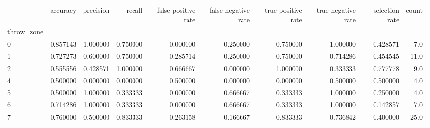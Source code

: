 \begin{tabular}{lrrrrrrrrr}
\toprule
{} &  accuracy &  precision &    recall &  false positive rate &  false negative rate &  true positive rate &  true negative rate &  selection rate &  count \\
throw\_zone &           &            &           &                      &                      &                     &                     &                 &        \\
\midrule
0          &  0.857143 &   1.000000 &  0.750000 &             0.000000 &             0.250000 &            0.750000 &            1.000000 &        0.428571 &    7.0 \\
1          &  0.727273 &   0.600000 &  0.750000 &             0.285714 &             0.250000 &            0.750000 &            0.714286 &        0.454545 &   11.0 \\
2          &  0.555556 &   0.428571 &  1.000000 &             0.666667 &             0.000000 &            1.000000 &            0.333333 &        0.777778 &    9.0 \\
4          &  0.500000 &   0.000000 &  0.000000 &             0.500000 &             0.000000 &            0.000000 &            0.500000 &        0.500000 &    4.0 \\
5          &  0.500000 &   1.000000 &  0.333333 &             0.000000 &             0.666667 &            0.333333 &            1.000000 &        0.250000 &    4.0 \\
6          &  0.714286 &   1.000000 &  0.333333 &             0.000000 &             0.666667 &            0.333333 &            1.000000 &        0.142857 &    7.0 \\
7          &  0.760000 &   0.500000 &  0.833333 &             0.263158 &             0.166667 &            0.833333 &            0.736842 &        0.400000 &   25.0 \\
\bottomrule
\end{tabular}
